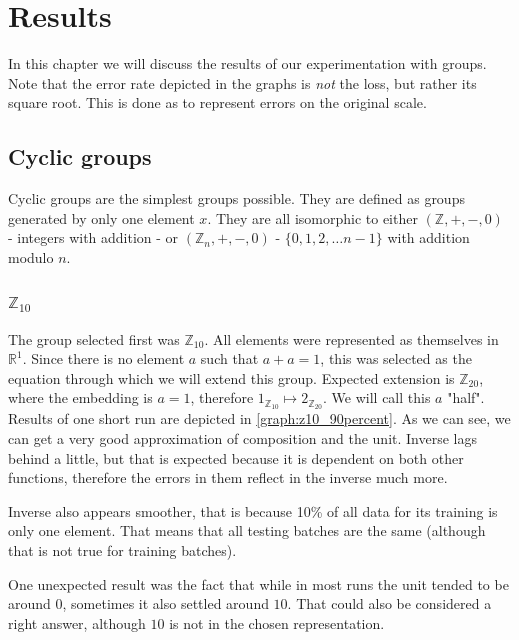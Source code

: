 \chapter{Results}
\label{chapter:results}
In this chapter we will discuss the results of our experimentation with groups. Note that the error rate depicted in the graphs is \textit{not} the loss, but rather its square root. This is done as to represent errors on the original scale.

\section{Cyclic groups}
Cyclic groups are the simplest groups possible. They are defined as groups generated by only one element $x$. They are all isomorphic to either $(\mathbb{Z},+,-,0)$ - integers with addition - or $(\mathbb{Z}_n,+,-,0)$ - $\{0,1,2,\dots n-1\}$ with addition modulo $n$.

\subsection{$\mathbb{Z}_{10}$}

The group selected first was $\mathbb{Z}_{10}$. All elements were represented as themselves in $\mathbb{R}^1$. Since there is no element $a$ such that $a+a=1$, this was selected as the equation through which we will extend this group. Expected extension is $\mathbb{Z}_{20}$, where the embedding is $a = 1$, therefore $1_{\mathbb{Z}_{10}}\mapsto 2_{\mathbb{Z}_{20}}$. We will call this $a$ "half".\\

Results of one short run are depicted in \autoref{graph:z10_90percent}. As we can see, we can get a very good approximation of composition and the unit. Inverse lags behind a little, but that is expected because it is dependent on both other functions, therefore the errors in them reflect in the inverse much more. 

Inverse also appears smoother, that is because 10\% of all data for its training is only one element. That means that all testing batches are the same (although that is not true for training batches).

One unexpected result was the fact that while in most runs the unit tended to be around $0$, sometimes it also settled around $10$. That could also be considered a right answer, although $10$ is not in the chosen representation.\\

